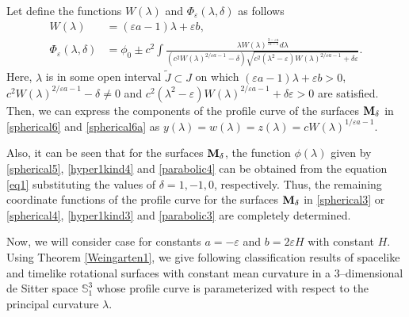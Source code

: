 \documentclass{amsart}
\theoremstyle{definition}
\numberwithin{equation}{section}
\begin{document}
Let define the functions $W(\lambda)$ and $\Phi_{\varepsilon}(\lambda,\delta)$ as follows 
\begin{align}
\label{eq}
W(\lambda)&=(\varepsilon a-1)\lambda+\varepsilon b,\\
  \label{eq1}
   \Phi_{\varepsilon}(\lambda,\delta)&=\phi_0\pm c^2
    \int{\frac{\lambda W(\lambda)
    ^{\frac{3-\varepsilon a}{\varepsilon a-1}}d\lambda}
    {(c^2 W(\lambda)^{2/ \varepsilon a-1}-\delta)
    \sqrt{c^2(\lambda^2-\varepsilon) W(\lambda)^{2/{\varepsilon a-1}}+\delta\varepsilon}}}. 
\end{align}
Here, $\lambda$ is in some open interval $\tilde{J}\subset J$ on which  
$(\varepsilon a-1)\lambda+\varepsilon b>0$,
 $c^2W(\lambda)^{2/\varepsilon a-1}-\delta\neq 0$
 and
$c^2(\lambda^2-\varepsilon)W(\lambda)^{2/{\varepsilon a-1}}+\delta\varepsilon>0$ are satisfied. 
Then, we can express the components of the profile curve 
of the surfaces ${\bf M}_{\delta}$ in \eqref{spherical6} and 
\eqref{spherical6a} as
$y(\lambda)=w(\lambda)=z(\lambda)=cW(\lambda)
^{1/{\varepsilon a-1}}$.

Also, it can be seen that  for the surfaces ${\bf M}_\delta$,
the function $\phi(\lambda)$ given by \eqref{spherical5}, \eqref{hyper1kind4} and \eqref{parabolic4} can be obtained from the equation \eqref{eq1} substituting the values of $\delta=1,-1,0$, respectively. 
Thus, the remaining coordinate functions of the profile curve for the surfaces ${\bf M}_{\delta}$
in \eqref{spherical3} or \eqref{spherical4}, \eqref{hyper1kind3} and \eqref{parabolic3} are completely determined.  

Now, we will consider case for constants $a=-\varepsilon$ 
and $b=2\varepsilon H$ with constant $H$. 
Using Theorem \ref{Weingarten1}, we give following classification results 
of spacelike and timelike rotational surfaces with constant mean curvature in a 3--dimensional de Sitter space $\mathbb{S}^3_1$ whose profile curve is 
parameterized with respect to the principal curvature $\lambda$. 
\end{document}
